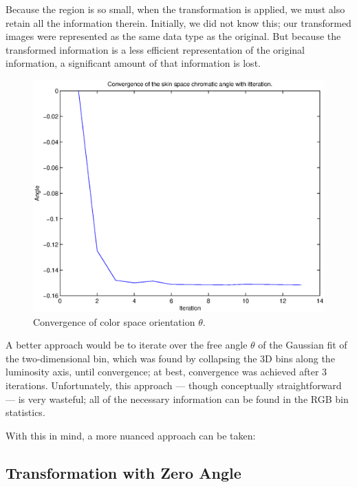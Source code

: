 Because the region is so small, when the transformation is applied, we must also retain all the information therein. Initially, we did not know this; our transformed images were represented as the same data type as the original. But because the transformed information is a less efficient representation of the original information, a significant amount of that information is lost.

\begin{figure}[h!]
  \caption{Convergence of color space orientation $\theta$.}
  \label{fig:ConvergenceTheta}
  \centering
    \includegraphics[width=\textwidth]{Chapter2/Figs/ConvergenceOfSkinSpaceFinal.eps}
\end{figure}

A better approach would be to iterate over the free angle $\theta$ of the Gaussian fit of the two-dimensional bin, which was found by collapsing the 3D bins along the luminosity axis, until convergence; at best, convergence was achieved after 3 iterations. Unfortunately, this approach --- though conceptually straightforward --- is very wasteful; all of the necessary information can be found in the RGB bin statistics. 

With this in mind, a more nuanced approach can be taken:

\subsection{Transformation with Zero Angle}\label{sec:TransWithZeroAngle}



